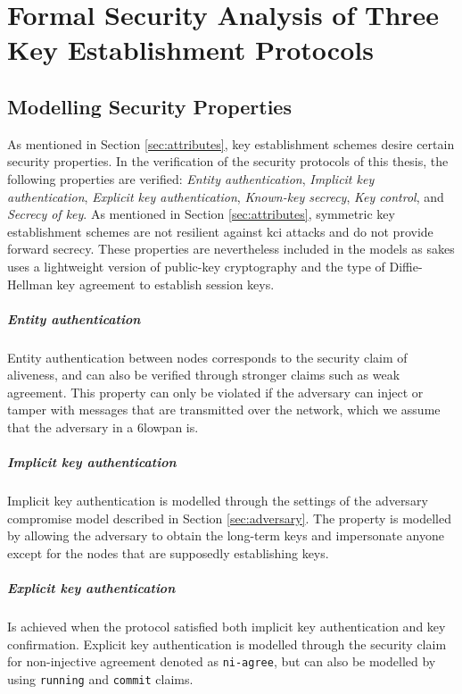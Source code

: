 \chapter{Formal Security Analysis of Three Key Establishment Protocols}
\label{chp:analysis}


\section{Modelling Security Properties}

As mentioned in Section \ref{sec:attributes}, key establishment schemes desire certain security properties. In the verification of the security protocols of this thesis, the following properties are verified: \emph{Entity authentication}, \emph{Implicit key authentication}, \emph{Explicit key authentication}, \emph{Known-key secrecy}, \emph{Key control}, and \emph{Secrecy of key}. As mentioned in Section \ref{sec:attributes}, symmetric key establishment schemes are not resilient against \gls{kci} attacks and do not provide forward secrecy. These properties are nevertheless included in the models as \gls{sakes} uses a lightweight version of public-key cryptography and the type of Diffie-Hellman key agreement to establish session keys.

\paragraph{Entity authentication} Entity authentication between nodes corresponds to the security claim of aliveness, and can also be verified through stronger claims such as weak agreement. This property can only be violated if the adversary can inject or tamper with messages that are transmitted over the network, which we assume that the adversary in a \gls{6lowpan} is.

\paragraph{Implicit key authentication} Implicit key authentication is modelled through the settings of the adversary compromise model described in Section \ref{sec:adversary}. The property is modelled by allowing the adversary to obtain the long-term keys and impersonate anyone except for the nodes that are supposedly establishing keys.

\paragraph{Explicit key authentication} Is achieved when the protocol satisfied both implicit key authentication and key confirmation. Explicit key authentication is modelled through the security claim for non-injective agreement denoted as \texttt{ni-agree}, but can also be modelled by using \texttt{running} and \texttt{commit} claims.

